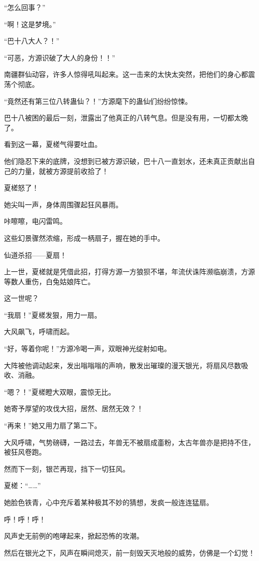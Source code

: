 \begin{this_body}
“怎么回事？”

“啊！这是梦境。”

“巴十八大人？！”

“可恶，方源识破了大人的身份！！”

南疆群仙动容，许多人惊得吼叫起来。这一击来的太快太突然，把他们的身心都震荡个彻底。

“竟然还有第三位八转蛊仙？！”方源麾下的蛊仙们纷纷惊悚。

巴十八被困的最后一刻，泄露出了他真正的八转气息。但是没有用，一切都太晚了。

看到这一幕，夏槎气得要吐血。

他们隐忍下来的底牌，没想到已被方源识破，巴十八一直划水，还未真正贡献出自己的力量，就被方源提前收拾了！

夏槎怒了！

她尖叫一声，身体周围骤起狂风暴雨。

咔嚓嚓，电闪雷鸣。

这些幻景骤然浓缩，形成一柄扇子，握在她的手中。

仙道杀招——夏扇！

上一世，夏槎就是凭借此招，打得方源一方狼狈不堪，年流伏诛阵濒临崩溃，方源等数人重伤，白兔姑娘阵亡。

这一世呢？

“我扇！”夏槎发狠，用力一扇。

大风飙飞，呼啸而起。

“好，等着你呢！”方源冷喝一声，双眼神光绽射如电。

大阵被他调动起来，发出嗡嗡嗡的声响，散发出璀璨的漫天银光，将扇风尽数吸收、消融。

“嗯？！”夏槎瞪大双眼，震惊无比。

她寄予厚望的攻伐大招，居然、居然无效？！

“再来！”她又用力扇了第二下。

大风呼啸，气势磅礴，一路过去，年兽无不被扇成齑粉，太古年兽亦是把持不住，被狂风卷跑。

然而下一刻，银芒再现，挡下一切狂风。

夏槎：“……”

她脸色铁青，心中充斥着某种极其不妙的猜想，发疯一般连连猛扇。

呼！呼！呼！

风声史无前例的咆哮起来，掀起恐怖的攻潮。

然后在银光之下，风声在瞬间熄灭，前一刻毁天灭地般的威势，仿佛是一个幻觉！


\end{this_body}
